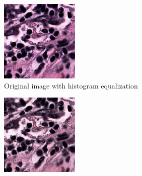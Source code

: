 \begin{figure}[H]
  \begin{subfigure}[b]{0.32\textwidth}
    \centering
    \includegraphics[width=\linewidth]{assets/images/for_presentation/eq_TCGA-EW-A1P8-01Z-00-DX1.E9852193-8CDD-49EF-B49B-DA6931198F0D_[8391, 13690, 8532, 13838].png}
    \caption{Original image with histogram equalization}\label{fig:tiger-eq}
  \end{subfigure}\hfill
  \begin{subfigure}[b]{0.32\textwidth}
    \centering
    \includegraphics[width=\linewidth]{assets/images/for_presentation/norm_eq_TCGA-EW-A1P8-01Z-00-DX1.E9852193-8CDD-49EF-B49B-DA6931198F0D_[8391, 13690, 8532, 13838].png}

\end{subfigure}
\end{figure}
